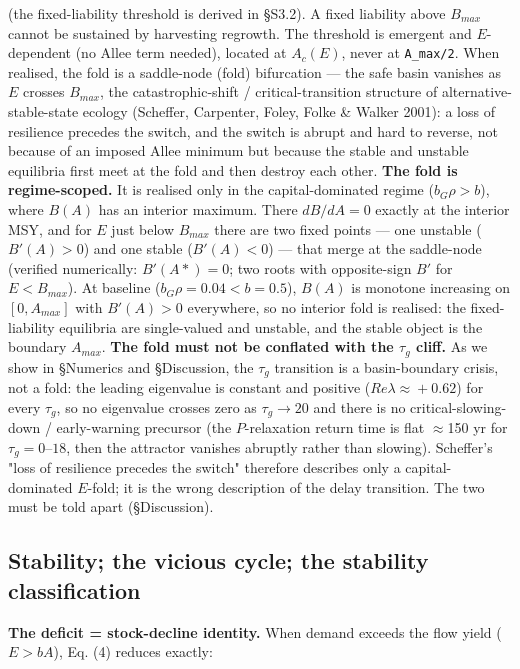 \documentclass[11pt]{article}
\begin{document}
(the fixed-liability threshold is derived in §S3.2). A fixed liability above $B_{max}$ cannot be sustained by harvesting regrowth. The threshold is emergent and $E$-dependent (no Allee term needed), located at $A_{c}(E)$, never at \texttt{A\_max/2}. When realised, the fold is a saddle-node (fold) bifurcation — the safe basin vanishes as $E$ crosses $B_{max}$, the catastrophic-shift / critical-transition structure of alternative-stable-state ecology (Scheffer, Carpenter, Foley, Folke \& Walker 2001): a loss of resilience precedes the switch, and the switch is abrupt and hard to reverse, not because of an imposed Allee minimum but because the stable and unstable equilibria first meet at the fold and then destroy each other. \textbf{The fold is regime-scoped.} It is realised only in the capital-dominated regime ($b_{G} \rho{} > b$), where $B(A)$ has an interior maximum. There $dB/dA = 0$ exactly at the interior MSY, and for $E$ just below $B_{max}$ there are two fixed points — one unstable ($B'(A) > 0$) and one stable ($B'(A) < 0$) — that merge at the saddle-node (verified numerically: $B'(A*) = 0$; two roots with opposite-sign $B'$ for $E < B_{max}$). At baseline ($b_{G} \rho{} = 0.04 < b = 0.5$), $B(A)$ is monotone increasing on $[0, A_{max}]$ with $B'(A) > 0$ everywhere, so no interior fold is realised: the fixed-liability equilibria are single-valued and unstable, and the stable object is the boundary $A_{max}$. \textbf{The fold must not be conflated with the $\tau{}_{g}$ cliff.} As we show in §Numerics and §Discussion, the $\tau{}_{g}$ transition is a basin-boundary crisis, not a fold: the leading eigenvalue is constant and positive ($Re \lambda{} \approx{} +0.62$) for every $\tau{}_{g}$, so no eigenvalue crosses zero as $\tau{}_{g} \to{} 20$ and there is no critical-slowing-down / early-warning precursor (the $P$-relaxation return time is flat \ensuremath{\approx{}}150 yr for $\tau{}_{g} = 0–18$, then the attractor vanishes abruptly rather than slowing). Scheffer's "loss of resilience precedes the switch" therefore describes only a capital-dominated $E$-fold; it is the wrong description of the delay transition. The two must be told apart (§Discussion).

\subsection{Stability; the vicious cycle; the stability classification}

\textbf{The deficit = stock-decline identity.} When demand exceeds the flow yield ($E > bA$), Eq. (4) reduces exactly:
\end{document}

